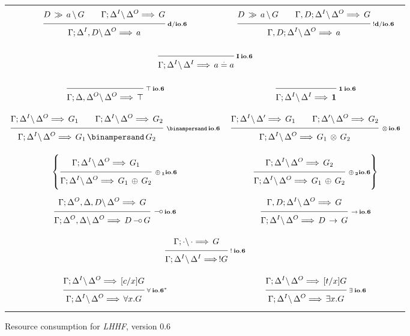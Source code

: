 \clearpage
\begin{figure}[t]
  \begin{center}
    \leavevmode

    \begin{tabular}{|cc|}
      \hline &\\
      $\ruleII
        {\decd{D}{a}{G}}
        {\ioVI{\G;\D^I}{\D^O}{G}}
        {\ioVI{\G;\D^I,D}{\D^O}{a}}
        {d/io.6}$
      &
      $\ruleII
        {\decd{D}{a}{G}}
        {\ioVI{\G,D;\D^I}{\D^O}{G}}
        {\ioVI{\G,D;\D^I}{\D^O}{a}}
        {!d/io.6}$
      \\&\\
      \multicolumn{2}{|c|}{
        $\ruleI
          {}
          {\ioVI{\G;\D^I}{\D^I}{\eq{a}{a}}}
          {I \: io.6}$}
      \\&\\

      $\ruleI
        {}
        {\ioVI{\G;\D,\D^O}{\D^O}{\Top}}
        {\Top \: io.6}$
      &
      $\ruleI
        {}
        {\ioVI{\G;\D^I}{\D^I}{\One}}
        {\One \: io.6}$
      \\&\\

      $\ruleII
        {\ioVI{\G;\D^I}{\D^O}{G_1}}
        {\ioVI{\G;\D^I}{\D^O}{G_2}}
        {\ioVI{\G;\D^I}{\D^O}{G_1 \With G_2}}
        {\With io.6}$
      &
      $\ruleII
        {\ioVI{\G;\D^I}{\D'}{G_1}}
        {\ioVI{\G;\D'}{\D^O}{G_2}}
        {\ioVI{\G;\D^I}{\D^O}{G_1 \Times G_2}}
        {\Times io.6}$
      \\&\\

      $\left\{
        \ruleI
          {\ioVI{\G;\D^I}{\D^O}{G_1}}
          {\ioVI{\G;\D^I}{\D^O}{G_1 \Plus G_2}}
          {\Plus_1 io.6}
      \right.$
      &
      $\left.
        \ruleI
          {\ioVI{\G;\D^I}{\D^O}{G_2}}
          {\ioVI{\G;\D^I}{\D^O}{G_1 \Plus G_2}}
          {\Plus_2 io.6}
      \right\}$
      \\&\\

      $\ruleI
        {\ioVI{\G;\D^O,\D,D}{\D^O}{G}}
        {\ioVI{\G;\D^O,\D}{\D^O}{D \Lolli G}}
        {\Lolli io.6}$
      &
      $\ruleI
        {\ioVI{\G,D;\D^I}{\D^O}{G}}
        {\ioVI{\G;\D^I}{\D^O}{D \Imp G}}
        {\Imp io.6}$
      \\&\\
      \multicolumn{2}{|c|}{
        $\ruleI
          {\ioVI{\G;\cdot}{\cdot}{G}}
          {\ioVI{\G;\D^I}{\D^I}{!G}}
          {! \: io.6}$}
      \\&\\

      $\ruleI
        {\ioVI{\G;\D^I}{\D^O}{[c/x]G}}
        {\ioVI{\G;\D^I}{\D^O}{\A x. G}}
        {\A \: io.6^*}$
      &
      $\ruleI
        {\ioVI{\G;\D^I}{\D^O}{[t/x]G}}
        {\ioVI{\G;\D^I}{\D^O}{\E x. G}}
        {\E \: io.6}$
      \\
      \hline
    \end{tabular}

    \caption{Resource consumption for {\em LHHF}, version 0.6}
    \label{fig:RC_VI}
  \end{center}
\end{figure}
